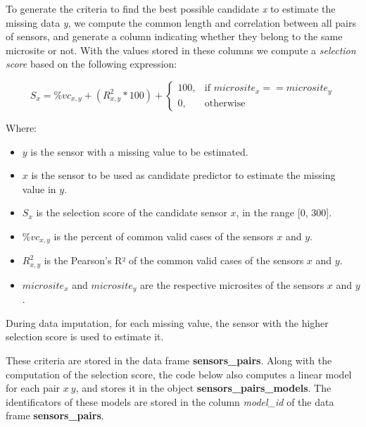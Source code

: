\documentclass[
  table]{article}
\providecommand{\tightlist}{%
  \setlength{\itemsep}{0pt}\setlength{\parskip}{0pt}}
\begin{document}
To generate the criteria to find the best possible candidate \emph{x} to
estimate the missing data \emph{y}, we compute the common length and
correlation between all pairs of sensors, and generate a column
indicating whether they belong to the same microsite or not. With the
values stored in these columns we compute a \emph{selection score} based
on the following expression:

\[S_{x} = \%vc_{x, y} + (R_{x, y}^2 * 100) + \left\{
\begin{array}{ll}
      100, & \mbox{if $microsite_{x} == microsite_{y}$}\\
      0, & \mbox{otherwise}
\end{array}
\right. \]

Where:

\begin{itemize}
\tightlist
\item
  \(y\) is the sensor with a missing value to be estimated.
\item
  \(x\) is the sensor to be used as candidate predictor to estimate the
  missing value in \(y\).
\item
  \(S_{x}\) is the selection score of the candidate sensor \(x\), in the
  range {[}0, 300{]}.
\item
  \(\%vc_{x, y}\) is the percent of common valid cases of the sensors
  \(x\) and \(y\).
\item
  \(R_{x, y}^2\) is the Pearson's R² of the common valid cases of the
  sensors \(x\) and \(y\).
\item
  \(microsite_{x}\) and \(microsite_{y}\) are the respective microsites
  of the sensors \(x\) and \(y\).
\end{itemize}

During data imputation, for each missing value, the sensor with the
higher selection score is used to estimate it.

These criteria are stored in the data frame \textbf{sensors\_pairs}.
Along with the computation of the selection score, the code below also
computes a linear model for each pair \(x ~ y\), and stores it in the
object \textbf{sensors\_pairs\_models}. The identificators of these
models are stored in the column \emph{model\_id} of the data frame
\textbf{sensors\_pairs}.
\end{document}
